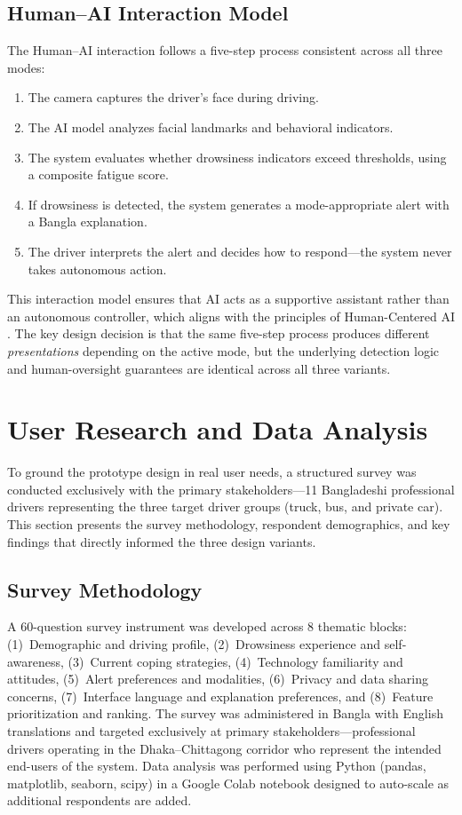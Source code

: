 \documentclass[sigconf]{acmart}
\begin{document}
\subsection{Human--AI Interaction Model}

The Human--AI interaction follows a five-step process consistent across all three modes:

\begin{enumerate}
    \item The camera captures the driver's face during driving.
    \item The AI model analyzes facial landmarks and behavioral indicators.
    \item The system evaluates whether drowsiness indicators exceed thresholds, using a composite fatigue score.
    \item If drowsiness is detected, the system generates a mode-appropriate alert with a Bangla explanation.
    \item The driver interprets the alert and decides how to respond---the system never takes autonomous action.
\end{enumerate}

This interaction model ensures that AI acts as a supportive assistant rather than an autonomous controller, which aligns with the principles of Human-Centered AI \cite{ref14}. The key design decision is that the same five-step process produces different \textit{presentations} depending on the active mode, but the underlying detection logic and human-oversight guarantees are identical across all three variants.


\section{User Research and Data Analysis}

To ground the prototype design in real user needs, a structured survey was conducted exclusively with the primary stakeholders---11 Bangladeshi professional drivers representing the three target driver groups (truck, bus, and private car). This section presents the survey methodology, respondent demographics, and key findings that directly informed the three design variants.

\subsection{Survey Methodology}

A 60-question survey instrument was developed across 8 thematic blocks: (1)~Demographic and driving profile, (2)~Drowsiness experience and self-awareness, (3)~Current coping strategies, (4)~Technology familiarity and attitudes, (5)~Alert preferences and modalities, (6)~Privacy and data sharing concerns, (7)~Interface language and explanation preferences, and (8)~Feature prioritization and ranking. The survey was administered in Bangla with English translations and targeted exclusively at primary stakeholders---professional drivers operating in the Dhaka--Chittagong corridor who represent the intended end-users of the system. Data analysis was performed using Python (pandas, matplotlib, seaborn, scipy) in a Google Colab notebook designed to auto-scale as additional respondents are added.
\end{document}
